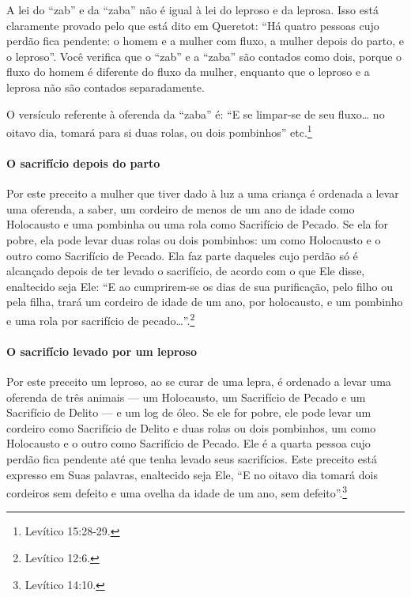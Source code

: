 A lei do ``zab'' e da ``zaba'' não é igual à lei do leproso e da
leprosa. Isso está claramente provado pelo que está dito em Queretot:
``Há quatro pessoas cujo perdão fica pendente: o homem e a mulher com
fluxo, a mulher depois do parto, e o leproso''. Você verifica que o
``zab'' e a ``zaba'' são contados como dois, porque o fluxo do homem é
diferente do fluxo da mulher, enquanto que o leproso e a leprosa não
são contados separadamente.

O versículo referente à oferenda da ``zaba'' é: ``E se limpar-se de seu
fluxo\ldots{} no oitavo dia, tomará para si duas rolas, ou dois pombinhos''
etc.\footnote{Levítico 15:28-29.}

\paragraph{O sacrifício depois do parto}

Por este preceito a mulher que tiver dado à luz a uma criança é
ordenada a levar uma oferenda, a saber, um cordeiro de menos de um ano
de idade como Holocausto e uma pombinha ou uma rola como Sacrifício de
Pecado. Se ela for pobre, ela pode levar duas rolas ou dois pombinhos:
um como Holocausto e o outro como Sacrifício de Pecado. Ela faz parte
daqueles cujo perdão só é alcançado depois de ter levado o sacrifício,
de acordo com o que Ele disse, enaltecido seja Ele: ``E ao cumprirem-se
os dias de sua purificação, pelo filho ou pela filha, trará um cordeiro
de idade de um ano, por holocausto, e um pombinho e uma rola por
sacrifício de pecado\ldots{}''.\footnote{Levítico 12:6.}

\paragraph{O sacrifício levado por um leproso}

Por este preceito um leproso, ao se curar de uma lepra, é ordenado a
levar uma oferenda de três animais --- um Holocausto, um Sacrifício de
Pecado e um Sacrifício de Delito --- e um log\starr{}
de óleo. Se ele for pobre, ele pode levar um cordeiro como Sacrifício de
Delito e duas rolas ou dois pombinhos, um como Holocausto e o outro como
Sacrifício de Pecado. Ele é a quarta pessoa cujo perdão fica pendente
até que tenha levado seus sacrifícios. Este preceito está expresso em
Suas palavras, enaltecido seja Ele, ``E no oitavo dia tomará dois
cordeiros sem defeito e uma ovelha da idade de um ano, sem defeito''.\footnote{Levítico 14:10.}

